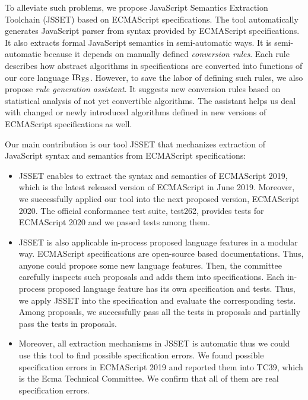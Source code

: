 To alleviate such problems, we propose JavaScript Semantics Extraction Toolchain (JSSET)
based on ECMAScript specifications. The tool automatically generates JavaScript parser
from syntax provided by ECMAScript specifications. It also extracts formal
JavaScript semantics in semi-automatic ways. It is semi-automatic because
it depends on manually defined \textit{conversion rules}. Each rule describes how abstract
algorithms in specifications are converted into functions of our core language \( \text{IR}_\text{ES} \).
However, to save the labor of defining such rules, we also propose \textit{rule generation assistant}.
It suggests new conversion rules based on statistical analysis of not yet convertible algorithms.
The assistant helps us deal with changed or newly introduced algorithms defined in new versions of
ECMAScript specifications as well.

Our main contribution is our tool JSSET that mechanizes extraction of JavaScript syntax and semantics
from ECMAScript specifications:
\begin{itemize}
  \item JSSET enables to extract the syntax and semantics of ECMAScript 2019,
    which is the latest released version of ECMAScript in June 2019.
    Moreover, we successfully applied our tool into the next proposed version,
    ECMAScript 2020. The official conformance test suite, test262, provides
     tests for ECMAScript 2020 and we passed  tests
    among them.
  \item JSSET is also applicable in-process proposed language features in a modular way.
    ECMAScript specifications are open-source based documentations. Thus, anyone
    could propose some new language features. Then, the committee carefully inspects
    such proposals and adds them into specifications. Each in-process proposed language
    feature has its own specification and tests. Thus, we apply JSSET into the specification
    and evaluate the corresponding tests. Among  proposals, we successfully
    pass all the tests in  proposals and partially pass the tests in 
    proposals.
  \item Moreover, all extraction mechanisms in JSSET is automatic thus we could use this tool
    to find possible specification errors. We found  possible specification errors
    in ECMAScript 2019 and reported them into TC39, which is the Ecma Technical Committee.
    We confirm that all of them are real specification errors.
\end{itemize}
